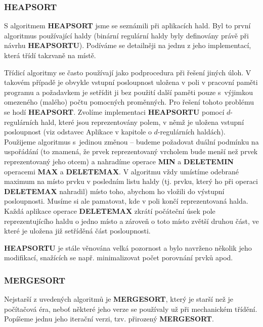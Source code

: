 \documentclass[a4paper,12pt]{article}
\begin{document}
\subsubsection{HEAPSORT}

S algoritmem {\bf HEAPSORT} jsme se seznámili při 
aplikacích hald.  Byl to první algoritmus používající haldy 
(binární regulár\-ní haldy byly definovány právě při návrhu 
{\bf HEAP\-SORTU}).  Podíváme se detailněji na jednu z jeho 
implementací, která třídí takzvaně na místě. 

Třídicí algoritmy se často používají jako 
podprocedura při řešení jiných úloh. V takovém případě je 
obvykle vstupní posloupnost uložena v poli v pracovní 
paměti programu a poža\-dav\-kem  je setřídit ji 
bez použití další 
paměti pouze s~výjimkou omezeného (malého) počtu pomocných 
proměnných. Pro řešení tohoto problému se hodí 
{\bf HEAPSORT}. Zvolíme implementaci {\bf HEAPSORTU} pomocí 
$d$-regulárních hald, které jsou reprezentovány  
polem, v němž je uložena vstupní posloupnost (viz odstavec 
Aplikace v kapitole o $d$-regulárních haldách). Použijeme 
algoritmus s~jedinou změnou -- budeme požadovat duální 
podmínku na uspořádání (to znamená, že prvek reprezentovaný 
vrcholem bude menší než prvek reprezentovaný jeho 
otcem) a nahradíme operace {\bf MIN} a {\bf DELETEMIN }
operacemi {\bf MAX} a {\bf DELETEMAX}. V algoritmu vždy umístíme 
odebrané maximum na místo prvku v posled\-ním listu 
haldy (tj. prvku, který ho při operaci {\bf DELETEMAX }
nahradil) místo toho, abychom ho vložili 
do výstupní posloupnosti. Musíme si ale 
pamatovat, kde v poli končí reprezentovaná halda. Každá 
aplikace operace {\bf DELETEMAX} zkrátí počáteční úsek pole 
reprezentujícího haldu o jedno místo 
a zároveň o toto místo zvětší druhou část, ve které je uložena již 
setříděná část posloupnosti. 

{\bf HEAPSORTU} je stále věnována velká pozornost a 
bylo navrže\-no několik jeho modifikací, snažících se 
např. minimalizovat počet porovnání prvků apod.

\subsubsection{MERGESORT}

Nejstarší z uvedených algoritmů je 
{\bf MERGESORT}, který je starší než je počítačová éra, 
neboť některé jeho 
verze se používaly už při mecha\-nickém třídění. Popíšeme 
jednu jeho iterační verzi, tzv. přirozený {\bf MERGESORT}. 
\end{document}
